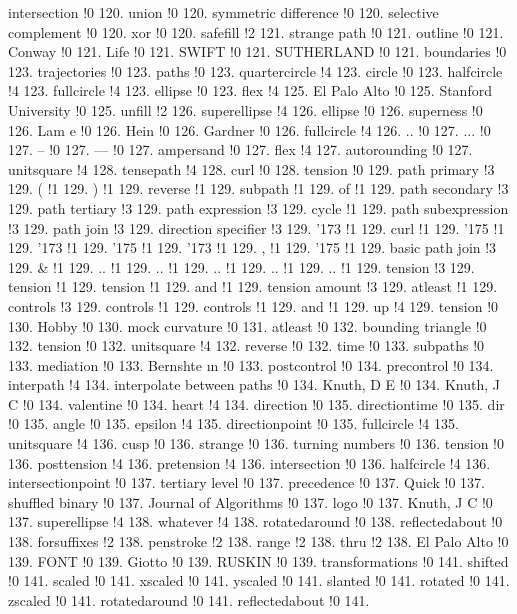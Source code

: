 intersection !0 120.
union !0 120.
symmetric difference !0 120.
selective complement !0 120.
xor !0 120.
safefill !2 121.
strange path !0 121.
outline !0 121.
Conway !0 121.
Life !0 121.
SWIFT !0 121.
SUTHERLAND !0 121.
boundaries !0 123.
trajectories !0 123.
paths !0 123.
quartercircle !4 123.
circle !0 123.
halfcircle !4 123.
fullcircle !4 123.
ellipse !0 123.
flex !4 125.
El Palo Alto !0 125.
Stanford University !0 125.
unfill !2 126.
superellipse !4 126.
ellipse !0 126.
superness !0 126.
Lam{ e} !0 126.
Hein !0 126.
Gardner !0 126.
fullcircle !4 126.
.. !0 127.
... !0 127.
-- !0 127.
--- !0 127.
ampersand !0 127.
flex !4 127.
autorounding !0 127.
unitsquare !4 128.
tensepath !4 128.
curl !0 128.
tension !0 129.
path primary !3 129.
( !1 129.
) !1 129.
reverse !1 129.
subpath !1 129.
of !1 129.
path secondary !3 129.
path tertiary !3 129.
path expression !3 129.
cycle !1 129.
path subexpression !3 129.
path join !3 129.
direction specifier !3 129.
\char '173 !1 129.
curl !1 129.
\char '175 !1 129.
\char '173 !1 129.
\char '175 !1 129.
\char '173 !1 129.
, !1 129.
\char '175 !1 129.
basic path join !3 129.
\& !1 129.
.. !1 129.
.. !1 129.
.. !1 129.
.. !1 129.
.. !1 129.
tension !3 129.
tension !1 129.
tension !1 129.
and !1 129.
tension amount !3 129.
atleast !1 129.
controls !3 129.
controls !1 129.
controls !1 129.
and !1 129.
up !4 129.
tension !0 130.
Hobby !0 130.
mock curvature !0 131.
atleast !0 132.
bounding triangle !0 132.
tension !0 132.
unitsquare !4 132.
reverse !0 132.
time !0 133.
subpaths !0 133.
mediation !0 133.
Bernshte{ \i }n !0 133.
postcontrol !0 134.
precontrol !0 134.
interpath !4 134.
interpolate between paths !0 134.
Knuth, D E !0 134.
Knuth, J C !0 134.
valentine !0 134.
heart !4 134.
direction !0 135.
directiontime !0 135.
dir !0 135.
angle !0 135.
epsilon !4 135.
directionpoint !0 135.
fullcircle !4 135.
unitsquare !4 136.
cusp !0 136.
strange !0 136.
turning numbers !0 136.
tension !0 136.
posttension !4 136.
pretension !4 136.
intersection !0 136.
halfcircle !4 136.
intersectionpoint !0 137.
tertiary level !0 137.
precedence !0 137.
Quick !0 137.
shuffled binary !0 137.
Journal of Algorithms !0 137.
logo !0 137.
Knuth, J C !0 137.
superellipse !4 138.
whatever !4 138.
rotatedaround !0 138.
reflectedabout !0 138.
forsuffixes !2 138.
penstroke !2 138.
range !2 138.
thru !2 138.
El Palo Alto !0 139.
FONT !0 139.
Giotto !0 139.
RUSKIN !0 139.
transformations !0 141.
shifted !0 141.
scaled !0 141.
xscaled !0 141.
yscaled !0 141.
slanted !0 141.
rotated !0 141.
zscaled !0 141.
rotatedaround !0 141.
reflectedabout !0 141.
